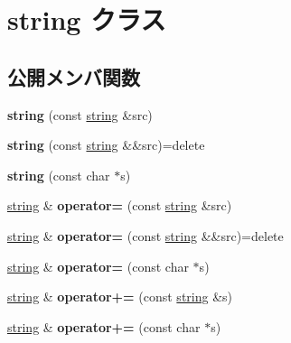 \hypertarget{classstring}{}\section{string クラス}
\label{classstring}
\subsection*{公開メンバ関数}
\begin{DoxyCompactItemize}
\item 
\hypertarget{classstring_a7be438791cb158f649ba2c58866d1041}{}{\bfseries string} (const \hyperlink{classstring}{string} \&src)\label{classstring_a7be438791cb158f649ba2c58866d1041}

\item 
\hypertarget{classstring_a08650761852125852da1c8d503f39b50}{}{\bfseries string} (const \hyperlink{classstring}{string} \&\&src)=delete\label{classstring_a08650761852125852da1c8d503f39b50}

\item 
\hypertarget{classstring_af57b95218cf3f736e262a59fb90e7738}{}{\bfseries string} (const char $\ast$s)\label{classstring_af57b95218cf3f736e262a59fb90e7738}

\item 
\hypertarget{classstring_a2a27afb0f4ef07f3ad896f3ccc17b153}{}\hyperlink{classstring}{string} \& {\bfseries operator=} (const \hyperlink{classstring}{string} \&src)\label{classstring_a2a27afb0f4ef07f3ad896f3ccc17b153}

\item 
\hypertarget{classstring_ac0bec002f343df4b87c80c85e9029a99}{}\hyperlink{classstring}{string} \& {\bfseries operator=} (const \hyperlink{classstring}{string} \&\&src)=delete\label{classstring_ac0bec002f343df4b87c80c85e9029a99}

\item 
\hypertarget{classstring_a8ca30c5805cc90734b6ce909f5d226de}{}\hyperlink{classstring}{string} \& {\bfseries operator=} (const char $\ast$s)\label{classstring_a8ca30c5805cc90734b6ce909f5d226de}

\item 
\hypertarget{classstring_a7979a89c07396681c5db34c0fbb75f7d}{}\hyperlink{classstring}{string} \& {\bfseries operator+=} (const \hyperlink{classstring}{string} \&s)\label{classstring_a7979a89c07396681c5db34c0fbb75f7d}

\item 
\hypertarget{classstring_a8baa4663463ca6cf20b74f2b6c2d2601}{}\hyperlink{classstring}{string} \& {\bfseries operator+=} (const char $\ast$s)\label{classstring_a8baa4663463ca6cf20b74f2b6c2d2601}


\end{DoxyCompactItemize}

